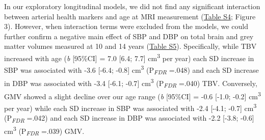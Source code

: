 \documentclass[
  letterpaper,
  DIV=11,
  numbers=noendperiod]{scrreport}
\begin{document}
In our exploratory longitudinal models, we did not find any significant
interaction between arterial health markers and age at MRI measurement
(\href{https://osf.io/2f4sg}{Table S4}; Figure 3). However, when
interaction terms were excluded from the models, we could further
confirm a negative main effect of SBP and DBP on total brain and grey
matter volumes measured at 10 and 14 years
(\href{https://osf.io/2f4sg}{Table S5}). Specifically, while TBV
increased with age (\emph{b} {[}95\%CI{]} = 7.0 {[}6.4; 7.7{]}
cm\textsuperscript{3} per year) each SD increase in SBP was associated
with -3.6 {[}-6.4; -0.8{]} cm\textsuperscript{3}
(P\textsubscript{\emph{FDR}} =.048) and each SD increase in DBP was
associated with -3.4 {[}-6.1; -0.7{]} cm\textsuperscript{3}
(P\textsubscript{\emph{FDR}} =.040) TBV. Conversely, GMV showed a slight
decline over our age range (\emph{b} {[}95\%CI{]} = -0.6 {[}-1.0;
-0.2{]} cm\textsuperscript{3} per year) while each SD increase in SBP
was associated with -2.4 {[}-4.1; -0.7{]} cm\textsuperscript{3}
(P\textsubscript{\emph{FDR}} =.042) and each SD increase in DBP was
associated with -2.2 {[}-3.8; -0.6{]} cm\textsuperscript{3}
(P\textsubscript{\emph{FDR}} =.039) GMV.
\end{document}
